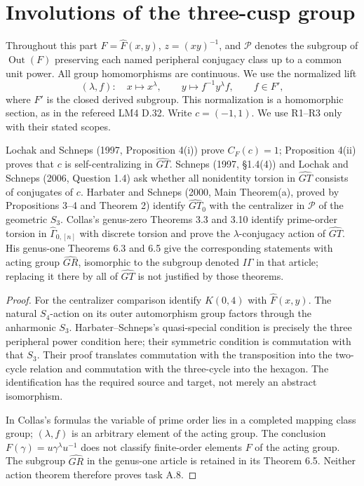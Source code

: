 \section{Involutions of the three-cusp group}

Throughout this part \(F=\widehat F(x,y)\), \(z=(xy)^{-1}\), and
\(\mathcal P\) denotes the subgroup of \(\operatorname{Out}(F)\)
preserving each named peripheral conjugacy class up to a common
unit power. All group homomorphisms are continuous. We use the
normalized lift
\[
 (\lambda,f):\quad x\longmapsto x^\lambda,\qquad
 y\longmapsto f^{-1}y^\lambda f,\qquad f\in F',
\]
where \(F'\) is the closed derived subgroup. This normalization is
a homomorphic section, as in the refereed LM4 D.32. Write
\(c=(-1,1)\). We use R1--R3 only with their stated scopes.

Lochak and Schneps (1997, Proposition 4(i)) prove
\(C_F(c)=1\); Proposition 4(ii) proves that \(c\) is
self-centralizing in \(\widehat{GT}\).
Schneps (1997, \S1.4(4)) and Lochak and Schneps (2006,
Question 1.4) ask whether all nonidentity torsion in
\(\widehat{GT}\) consists of conjugates of \(c\).
Harbater and Schneps (2000, Main Theorem(a), proved by
Propositions 3--4 and Theorem 2) identify
\(\widehat{GT}_0\) with the centralizer in \(\mathcal P\) of
the geometric \(S_3\).
Collas's genus-zero Theorems 3.3 and 3.10 identify prime-order
torsion in \(\widehat\Gamma_{0,[n]}\) with discrete torsion
and prove the \(\lambda\)-conjugacy action of \(\widehat{GT}\).
His genus-one Theorems 6.3 and 6.5 give the corresponding
statements with acting group \(\widehat{GR}\), isomorphic
to the subgroup denoted \(I\Gamma\) in that article;
replacing it there by all of \(\widehat{GT}\) is not
justified by those theorems.\cite{A_LS1997,A_Schneps1997,A_LS2006,A_HS2000,A_Collas2012a,A_Collas2012b}

\begin{proof}
For the centralizer comparison identify \(K(0,4)\) with
\(\widehat F(x,y)\). The natural \(S_4\)-action on its outer
automorphism group factors through the anharmonic \(S_3\).
Harbater--Schneps's quasi-special condition is precisely the
three peripheral power condition here; their symmetric
condition is commutation with that \(S_3\). Their proof
translates commutation with the transposition into the
two-cycle relation and commutation with the three-cycle into
the hexagon. The identification has the required source
and target, not merely an abstract isomorphism.

In Collas's formulas the variable of prime order lies in a
completed mapping class group; \((\lambda,f)\) is an arbitrary
element of the acting group. The conclusion
\(F(\gamma)=u\gamma^\lambda u^{-1}\) does not classify
finite-order elements \(F\) of the acting group. The subgroup
\(\widehat{GR}\) in the genus-one article is retained in its
Theorem 6.5. Neither action theorem therefore proves task A.8.
\end{proof}

